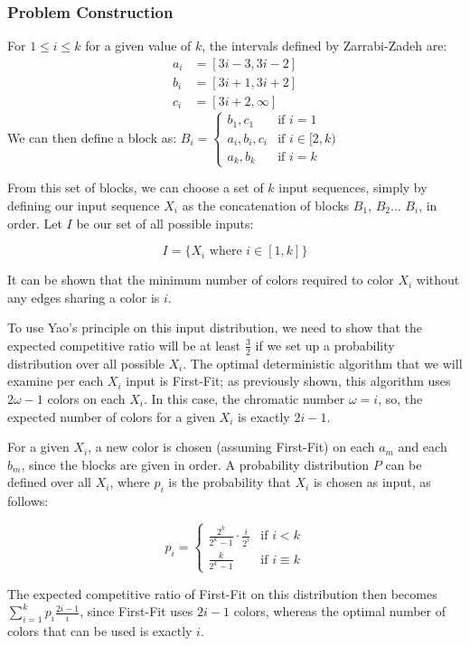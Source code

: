 \subsubsection{Problem Construction}
For $1\le i\le k$ for a given value of $k$, the intervals defined by Zarrabi-Zadeh \cite{zarrabi} are: 
\begin{align*}
	a_i &= [3i-3, 3i-2] \\
	b_i &= [3i+1, 3i+2] \\
	c_i &= [3i+2, \infty]
\end{align*}
We can then define a block as:
$B_i = \begin{cases} {b_1, c_1} &\mbox{if } i = 1 \\
{a_i, b_i, c_i} & \mbox{if } i \in [2,k) \\
 {a_k, b_k} &\mbox{if } i = k \end{cases}$ 

From this set of blocks, we can choose a set of $k$ input sequences, simply by defining our input sequence $X_i$ as the concatenation of blocks $B_1$, $B_2$... $B_i$, in order. Let $I$ be our set of all possible inputs:

\[I = \{X_i \text{ where } i \in [1,k]\}\]

It can be shown that the minimum number of colors required to color $X_i$ without any edges sharing a color is $i$.

To use Yao's principle on this input distribution, we need to show that the expected competitive ratio will be at least $\frac{3}{2}$ if we set up a probability distribution over all possible $X_i$. The optimal deterministic algorithm that we will examine per each $X_i$ input is First-Fit; as previously shown, this algorithm uses $2\omega-1$ colors on each $X_i$. In this case, the chromatic number $\omega=i$, so, the expected number of colors for a given $X_i$ is exactly $2i-1$.

For a given $X_i$, a new color is chosen (assuming First-Fit) on each $a_m$ and each $b_m$, since the blocks are given in order. A probability distribution $P$ can be defined over all $X_i$, where $p_i$ is the probability that $X_i$ is chosen as input, as follows:

\[p_i = \begin{cases} \frac{2^k}{2^k-1}\cdot\frac{i}{2^i} &\mbox{if } i < k \\
\frac{k}{2^k-1} & \mbox{if } i \equiv k 
 \end{cases}\]

The expected competitive ratio of First-Fit on this distribution then becomes $\sum_{i=1}^k p_i\frac{2i-1}{i}$, since First-Fit uses $2i-1$ colors, whereas the optimal number of colors that can be used is exactly $i$.

